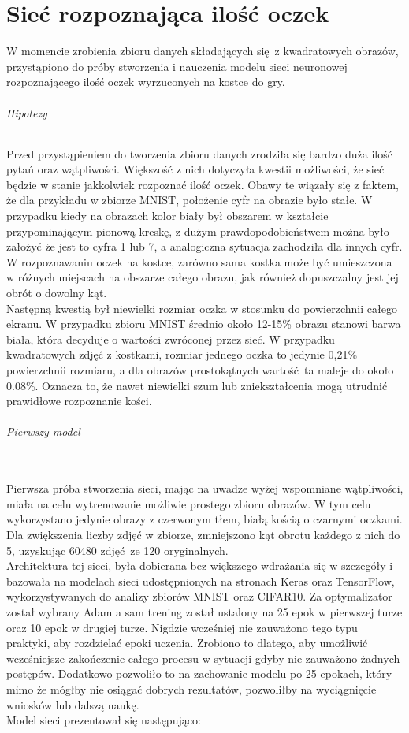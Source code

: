 
\chapter{Sieć rozpoznająca ilość oczek}

W momencie zrobienia zbioru danych składających się z kwadratowych obrazów, przystąpiono
do próby stworzenia i nauczenia modelu sieci neuronowej rozpoznającego ilość oczek
wyrzuconych na kostce do gry. \\

\subparagraph{Hipotezy} \mbox{}
Przed przystąpieniem do tworzenia zbioru danych zrodziła się bardzo duża ilość pytań
oraz wątpliwości. Większość z nich dotyczyła kwestii możliwości, że sieć będzie w stanie
jakkolwiek rozpoznać ilość oczek. Obawy te wiązały się z faktem, że dla przykładu
w zbiorze MNIST, położenie cyfr na obrazie było stałe. W przypadku kiedy na obrazach
kolor biały był obszarem w kształcie przypominającym pionową kreskę, z dużym
prawdopodobieństwem można było założyć że jest to cyfra 1 lub 7, a analogiczna
sytuacja zachodziła dla innych cyfr. W rozpoznawaniu oczek na kostce, zarówno sama
kostka może być umieszczona w różnych miejscach na obszarze całego obrazu, jak również
dopuszczalny jest jej obrót o dowolny kąt. \\
Następną kwestią był niewielki rozmiar oczka w stosunku do powierzchnii całego ekranu.
W przypadku zbioru MNIST średnio około 12-15\% obrazu stanowi barwa biała, która
decyduje o wartości zwróconej przez sieć. W przypadku kwadratowych zdjęć z kostkami,
rozmiar jednego oczka to jedynie 0,21\% powierzchnii rozmiaru, a dla obrazów prostokątnych
wartość ta maleje do około 0.08\%. Oznacza to, że nawet niewielki szum lub
zniekształcenia mogą utrudnić prawidłowe rozpoznanie kości. \\

\subparagraph{Pierwszy model} \mbox{}\\
Pierwsza próba stworzenia sieci, mając na uwadze wyżej wspomniane wątpliwości, miała
na celu wytrenowanie możliwie prostego zbioru obrazów. W tym celu wykorzystano
jedynie obrazy z czerwonym tłem, białą kością o czarnymi oczkami. Dla zwiększenia
liczby zdjęć w zbiorze, zmniejszono kąt obrotu każdego z nich do 5,
uzyskując 60480 zdjęć ze 120 oryginalnych. \\
Architektura tej sieci, była dobierana bez większego wdrażania się w szczegóły i
bazowała na modelach sieci udostępnionych na stronach Keras oraz TensorFlow,
wykorzystywanych do analizy zbiorów MNIST oraz CIFAR10. Za optymalizator został wybrany
Adam a sam trening został ustalony na 25 epok w pierwszej turze oraz 10 epok w drugiej
turze. Nigdzie wcześniej nie zauważono tego typu praktyki, aby rozdzielać epoki uczenia.
Zrobiono to dlatego, aby umożliwić wcześniejsze zakończenie całego procesu w sytuacji
gdyby nie zauważono żadnych postępów. Dodatkowo pozwoliło to na zachowanie modelu
po 25 epokach, który mimo że mógłby nie osiągać dobrych rezultatów, pozwoliłby
na wyciągnięcie wniosków lub dalszą naukę. \\
Model sieci prezentował się następująco: \\\\

